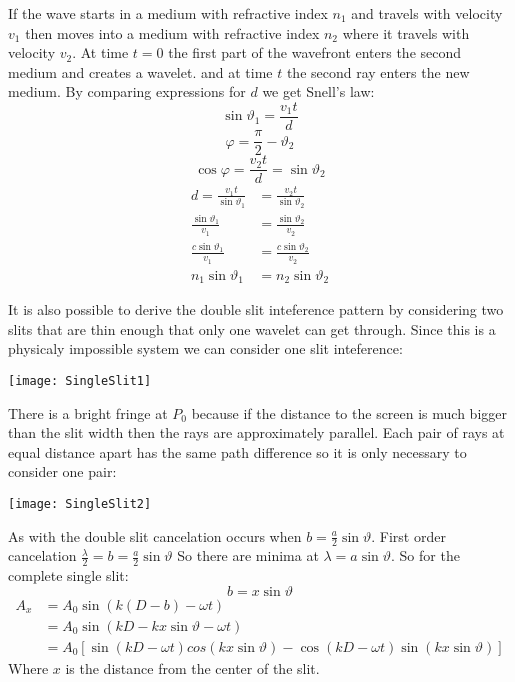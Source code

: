 If the wave starts in a medium with refractive index \(n_1\) and travels with velocity \(v_1\) then moves into a medium with refractive index \(n_2\) where it travels with velocity \(v_2\). At time \(t=0\) the first part of the wavefront enters the second medium and creates a wavelet. and at time \(t\) the second ray enters the new medium. By comparing expressions for \(d\) we get Snell's law:
\[\sin \vartheta_1=\frac{v_1t}{d}\]
\[\varphi = \frac{\pi}{2}-\vartheta_2\]
\[\cos\varphi=\frac{v_2t}{d}=\sin\vartheta_2\]
\begin{align*}
d=\frac{v_1t}{\sin\vartheta_1}&=\frac{v_2t}{\sin\vartheta_2}\\
\frac{\sin\vartheta_1}{v_1}&=\frac{\sin\vartheta_2}{v_2}\\
\frac{c\sin\vartheta_1}{v_1}&=\frac{c\sin\vartheta_2}{v_2}\\
n_1\sin\vartheta_1&=n_2\sin\vartheta_2
\end{align*}

It is also possible to derive the double slit inteference pattern by considering two slits that are thin enough that only one wavelet can get through. Since this is a physicaly impossible system we can consider one slit inteference:

\begin{center}
\texttt{[image: SingleSlit1]}
\end{center}

There is a bright fringe at \(P_0\) because if the distance to the screen is much bigger than the slit width then the rays are approximately parallel. Each pair of rays at equal distance apart has the same path difference so it is only necessary to consider one pair:

\begin{center}
\texttt{[image: SingleSlit2]}
\end{center}

As with the double slit cancelation occurs when \(b=\frac a2\sin\vartheta\). First order cancelation \(\frac{\lambda}{2}=b=\frac a2\sin\vartheta\) So there are minima at \(\lambda=a\sin\vartheta\). So for the complete single slit:
\[b=x\sin\vartheta\]
\begin{align*}
A_x &= A_0\sin(k(D-b)-\omega t)\\
&= A_0\sin(kD-kx\sin\vartheta-\omega t)\\
&= A_0[\sin(kD-\omega t)cos(kx\sin\vartheta)-\cos(kD-\omega t)\sin(kx\sin\vartheta)]
\end{align*}
Where \(x\) is the distance from the center of the slit.

